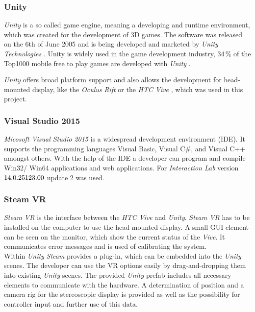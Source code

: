 	
	\subsubsection{Unity}\label{sec:unity}
	
	\textit{Unity} is a so called game engine, meaning a developing and runtime environment, which was created for the development of 3D games. The software was released on the 6th of June 2005 \cite{haas2014histor} and is being developed and marketed by \textit{Unity Technologies} \cite{website:Unity}. Unity is widely used in the game development industry, $34\,\%$ of the Top1000  mobile free to play games are developed with \textit{Unity} \cite{website:UnityPR}. 
	
	\textit{Unity} offers broad platform support \cite{website:UnityMultiPlatform} and also allows the development for head-mounted display, like the \textit{Oculus Rift} \cite{website:UnityVRoverview} or the \textit{HTC Vive} \cite{website:UnityVRoverview}, which was used in this project.
	
	\subsubsection{Visual Studio 2015}\label{sec:VisualStudio}
	
	\textit{Micosoft Visual Studio 2015} is a widespread development environment (IDE). It supports the programming languages Visual Basic, Visual C$\#$, and Visual C++ amongst others. With the help of the IDE a developer can program and compile Win32/ Win64 applications and web applications. For \textit{Interaction Lab} version~$14.0.\-25123.00$ update $2$ was used.
	
	\subsubsection{Steam VR}
	
	\textit{Steam VR} \cite{website:steamVR} is the interface between the \textit{HTC Vive} and \textit{Unity}. \textit{Steam VR} has to be installed on the computer to use the head-mounted display. A small GUI element can be seen on the monitor, which show the current status of the \textit{Vive}. It communicates error messages and is used of calibrating the system. \\
	Within \textit{Unity} \textit{Steam} provides a plug-in, which can be embedded into the \textit{Unity}  scenes. The developer can use the VR options easily by drag-and-dropping them into existing \textit{Unity} scenes. 
	The provided \textit{Unity} prefab includes all necessary elements to communicate with the hardware. A determination of position and a camera rig for the stereoscopic display is provided as well as the possibility for controller input and further use of this data.
	
	\newpage
